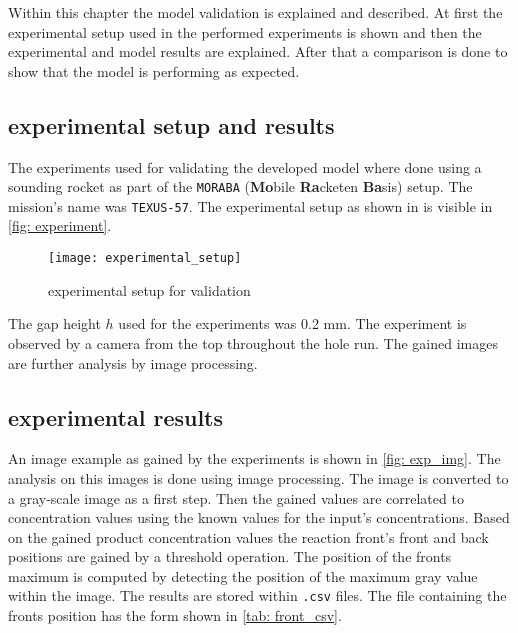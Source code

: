 \documentclass[../thesis.tex]{subfiles}
\begin{document}
Within this chapter the model validation is explained and described. At first the experimental setup used in the performed experiments is shown and then the experimental and model results are explained. After that a comparison is done to show that the model is performing as expected.

\subsection{experimental setup and results}

The experiments used for validating the developed model where done using a sounding rocket as part of the \texttt{MORABA} (\textbf{Mo}bile \textbf{Ra}cketen \textbf{Ba}sis) \cite{stamminger2012moraba} setup. The mission's name was \texttt{TEXUS-57}. The experimental setup as shown in \cite{stergiou2022effects} is visible in \autoref{fig: experiment}.
\begin{figure}[htbp]
	\centering
	\texttt{[image: experimental\_setup]}
	\caption{experimental setup for validation \cite{stergiou2022effects}}
	\label{fig: experiment}
\end{figure}
The gap height $h$ used for the experiments was 0.2 mm. The experiment is observed by a camera from the top throughout the hole run. The gained images are further analysis by image processing.

\subsection{experimental results}

An image example as gained by the experiments is shown in \autoref{fig: exp_img}. The analysis on this images is done using image processing. The image is converted to a gray-scale image as a first step. Then the gained values are correlated to concentration values using the known values for the input's concentrations. Based on the gained product concentration values the reaction front's front and back positions are gained by a threshold operation. The position of the fronts maximum is computed by detecting the position of the maximum gray value within the image. The results are stored within \texttt{.csv} files. The file containing the fronts position has the form shown in \autoref{tab: front_csv}. 
\end{document}
